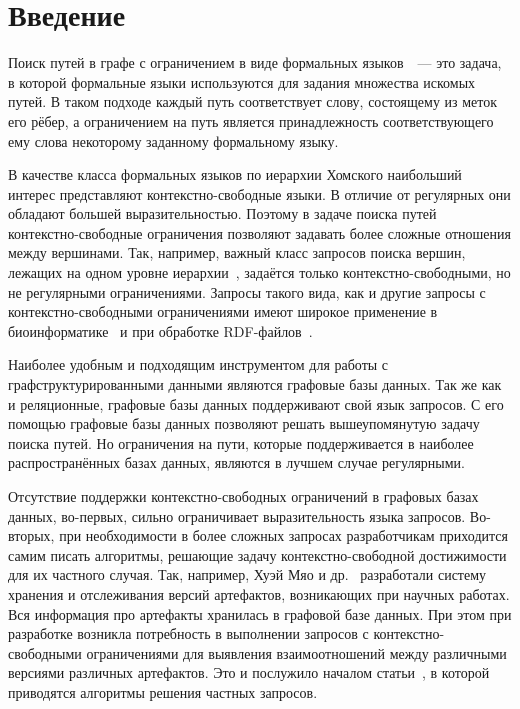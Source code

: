 \section*{Введение}

Поиск путей в графе с ограничением в виде формальных языков~\cite{FLCpathProblem}~--- это задача, в которой формальные языки используются для задания множества искомых путей. В таком подходе каждый путь соответствует слову, состоящему из меток его рёбер, а ограничением на путь является принадлежность соответствующего ему слова некоторому заданному формальному языку.

В качестве класса формальных языков по иерархии Хомского наибольший интерес представляют контекстно-свободные языки. В отличие от регулярных они обладают большей выразительностью. Поэтому в задаче поиска путей контекстно-свободные ограничения позволяют задавать более сложные отношения между вершинами. Так, например, важный класс запросов поиска вершин, лежащих на одном уровне иерархии~\cite{zhlang-2016}, задаётся только контекстно-свободными, но не регулярными ограничениями. Запросы такого вида, как и другие запросы с контекстно-свободными ограничениями имеют широкое применение в биоинформатике~\cite{bio-application} и при обработке RDF-файлов~\cite{zhlang-2016}.

Наиболее удобным и подходящим инструментом для работы с граф\-структурированными данными являются графовые базы данных. Так же как и реляционные, графовые базы данных поддерживают свой язык запросов. С его помощью графовые базы данных позволяют решать вышеупомянутую задачу поиска путей. Но ограничения на пути, которые поддерживается в наиболее распространённых базах данных, являются в лучшем случае регулярными.

Отсутствие поддержки контекстно-свободных ограничений в графовых базах данных, во-первых, сильно ограничивает выразительность языка запросов. Во-вторых, при необходимости в более сложных запросах разработчикам приходится самим писать алгоритмы, решающие задачу контекстно-свободной достижимости для их частного случая. Так, например, Хуэй Мяо и др.~\cite{datascince-lifecycle} разработали систему хранения и отслеживания версий артефактов, возникающих при научных работах. Вся информация про артефакты хранилась в графовой базе данных. При этом при разработке возникла потребность в выполнении запросов с контекстно-свободными ограничениями для выявления взаимоотношений между различными версиями различных артефактов. Это и послужило началом статьи~\cite{datascince-lifecycle}, в которой приводятся алгоритмы решения частных запросов.

